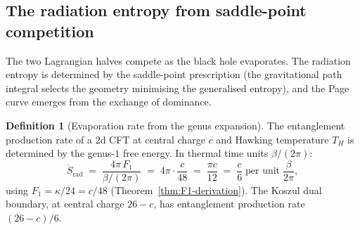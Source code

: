 \documentclass[11pt,reqno]{amsart}
\theoremstyle{definition}
\newtheorem{definition}[theorem]{Definition}
\theoremstyle{remark}
\begin{document}
\subsection{The radiation entropy from saddle-point competition}

The two Lagrangian halves compete as the black hole evaporates.
The radiation entropy is determined by the saddle-point
prescription (the gravitational path integral selects the
geometry minimising the generalised entropy), and the Page
curve emerges from the exchange of dominance.

\begin{definition}[Evaporation rate from the genus expansion]
\label{def:evaporation-rate}
The entanglement production rate of a $2$d CFT at central charge
$c$ and Hawking temperature $T_H$ is determined by the genus-$1$
free energy. In thermal time units $\beta/(2\pi)$:
\begin{equation}\label{eq:evaporation-rate}
\dot{S}_{\mathrm{rad}}
\;=\;
\frac{4\pi\,F_1}{\beta/(2\pi)}
\;=\;
4\pi \cdot \frac{c}{48}
\;=\;
\frac{\pi c}{12}
\;=\;
\frac{c}{6}\;\text{per unit}\;\frac{\beta}{2\pi},
\end{equation}
using $F_1 = \kappa/24 = c/48$
(Theorem~\ref{thm:F1-derivation}).
The Koszul dual boundary, at central charge $26-c$, has
entanglement production rate $(26-c)/6$.
\end{definition}
\end{document}
